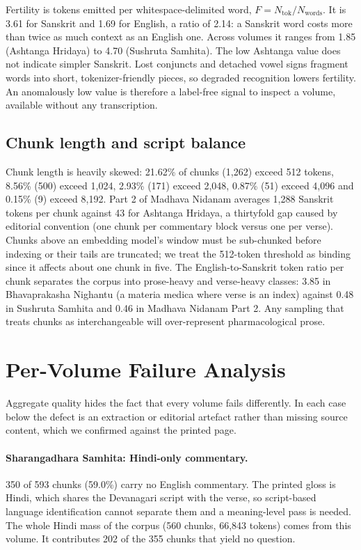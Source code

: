 \documentclass[10pt,twocolumn,letterpaper]{article}
\begin{document}
Fertility is tokens emitted per whitespace-delimited word, $F = N_{\text{tok}} /
N_{\text{words}}$. It is 3.61 for Sanskrit and 1.69 for English, a ratio of 2.14:
a Sanskrit word costs more than twice as much context as an English one. Across
volumes it ranges from 1.85 (Ashtanga Hridaya) to 4.70 (Sushruta Samhita). The
low Ashtanga value does not indicate simpler Sanskrit. Lost conjuncts and
detached vowel signs fragment words into short, tokenizer-friendly pieces, so
degraded recognition lowers fertility. An anomalously low value is therefore a
label-free signal to inspect a volume, available without any transcription.

\subsection{Chunk length and script balance}

Chunk length is heavily skewed: 21.62\% of chunks (1{,}262) exceed 512 tokens,
8.56\% (500) exceed 1{,}024, 2.93\% (171) exceed 2{,}048, 0.87\% (51) exceed 4{,}096
and 0.15\% (9) exceed 8{,}192. Part 2 of Madhava Nidanam averages 1{,}288 Sanskrit
tokens per chunk against 43 for Ashtanga Hridaya, a thirtyfold gap caused by
editorial convention (one chunk per commentary block versus one per verse).
Chunks above an embedding model's window must be sub-chunked before indexing or
their tails are truncated; we treat the 512-token threshold as binding since it
affects about one chunk in five. The English-to-Sanskrit token ratio per chunk
separates the corpus into prose-heavy and verse-heavy classes: 3.85 in Bhavaprakasha
Nighantu (a materia medica where verse is an index) against 0.48 in Sushruta
Samhita and 0.46 in Madhava Nidanam Part 2. Any sampling that treats chunks as
interchangeable will over-represent pharmacological prose.

\section{Per-Volume Failure Analysis}
\label{sec:failure}

Aggregate quality hides the fact that every volume fails differently. In each
case below the defect is an extraction or editorial artefact rather than missing
source content, which we confirmed against the printed page.

\paragraph{Sharangadhara Samhita: Hindi-only commentary.}
350 of 593 chunks (59.0\%) carry no English commentary. The printed gloss is
Hindi, which shares the Devanagari script with the verse, so script-based
language identification cannot separate them and a meaning-level pass is needed.
The whole Hindi mass of the corpus (560 chunks, 66{,}843 tokens) comes from this
volume. It contributes 202 of the 355 chunks that yield no question.
\end{document}
